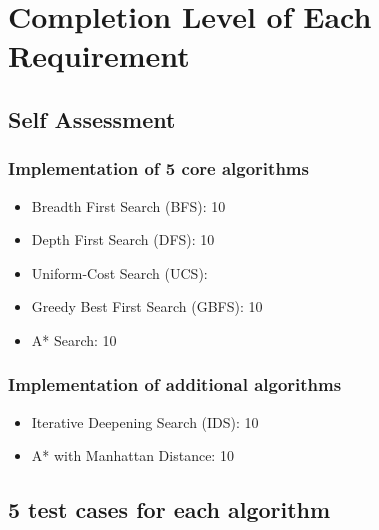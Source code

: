 \section{Completion Level of Each Requirement}
\subsection{Self Assessment}
\subsubsection{Implementation of 5 core algorithms}
\begin{itemize}
    \item Breadth First Search (BFS): 10
    \item Depth First Search (DFS): 10
    \item Uniform-Cost Search (UCS): 
    \item Greedy Best First Search (GBFS): 10
    \item A* Search: 10
\end{itemize}
\subsubsection{Implementation of additional algorithms}
\begin{itemize}
    \item Iterative Deepening Search (IDS): 10
    \item A* with Manhattan Distance: 10
\end{itemize}
\subsection{5 test cases for each algorithm}

